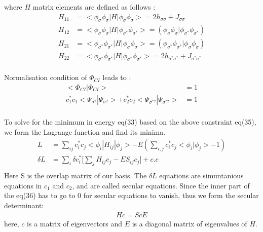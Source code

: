 \documentclass[11pt]{article}   	%
\begin{document}
	where $H$ matrix elements are defined as follows :\\
	\begin{equation}
	\begin{split}
		H_{11}&=<\phi_{\sigma}\phi_{\sigma}|H|\phi_{\sigma}\phi_{\sigma}>=2 h_{\sigma\sigma}+J_{\sigma\sigma}\\
		H_{12}&=<\phi_{\sigma}\phi_{\sigma}|H|\phi_{\sigma^*}\phi_{\sigma^*}>=(\phi_{\sigma}
		\phi_{\sigma}|\phi_{\sigma^*}\phi_{\sigma^*})\\
		H_{21}&=<\phi_{\sigma^*}\phi_{\sigma^*}|H|\phi_{\sigma}\phi_{\sigma}>=(\phi_{\sigma^*}
		\phi_{\sigma^*}|\phi_{\sigma}\phi_{\sigma})\\
		H_{22}&=<\phi_{\sigma^*}\phi_{\sigma^*}|H|\phi_{\sigma^*}\phi_{\sigma^*}>=2 h_{\sigma^*\sigma^*}+J_{\sigma^*\sigma^*}\\
	\end{split}
	\end{equation}


	Normalisation condition of $\Phi_{CI}$ leads to :\\
	\begin{equation}
	\begin{split}
		<\Phi_{CI}|\Phi_{CI}>&=1\\
		c_1^*c_1<\Psi_{\sigma^2}|\Psi_{\sigma^2}>+c_2^*c_2<\Psi_{\sigma^{*2}}|\Psi_{\sigma^{*2}}>&=1\\
	\end{split}	
	\end{equation}
	
	To solve for the minimum in energy eq(33) based on the above constraint eq(35), we form the Lagrange function and
	 find its minima.  
	\begin{equation}
	\begin{split}
	L&=\sum_{ij}c_i^*c_j<\phi_i|H_{ij}|\phi_j>-E(\sum_{i,j}c_i^*c_j<\phi_i|\phi_j>-1)\\
	\delta L&=\sum_i\delta c_i^*\big[\sum_j H_{ij}c_j-ES_{ij}c_j\big]+c.c\\
	\end{split}
	\end{equation}
	Here S is the overlap matrix of our basis. The $\delta L$ equations are simuntanious 
	equations in $c_1$ and $c_2$, and are called secular equations. Since the inner part of the 
	eq(36) has to go to 0 for secular equations to vanish, thus we form
	the secular determinant:\\
	\begin{equation}
	\begin{split}
		Hc=ScE
	\end{split}
	\end{equation}
	here, $c$ is a matrix of eigenvectors and $E$ is a diagonal matrix of eigenvalues of $H$.\\
\end{document}

